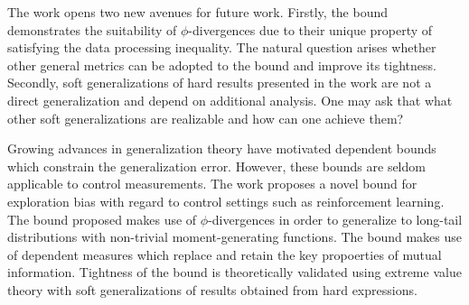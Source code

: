 \documentclass[11pt,letterpaper]{article}
\begin{document}
The work opens two new avenues for future work. Firstly, the bound demonstrates the suitability of $\phi$-divergences due to their unique property of satisfying the data processing inequality. The natural question arises whether other general metrics can be adopted to the bound and improve its tightness. Secondly, soft generalizations of hard results presented in the work are not a direct generalization and depend on additional analysis. One may ask that what other soft generalizations are realizable and how can one achieve them?

Growing advances in generalization theory have motivated dependent bounds which constrain the generalization error. However, these bounds are seldom applicable to control measurements. The work proposes a novel bound for exploration bias with regard to control settings such as reinforcement learning. The bound proposed makes use of $\phi$-divergences in order to generalize to long-tail distributions with non-trivial moment-generating functions. The bound makes use of dependent measures which replace and retain the key propoerties of mutual information. Tightness of the bound is theoretically validated using extreme value theory with soft generalizations of results obtained from hard expressions. 
\end{document}
